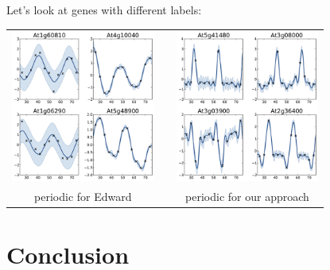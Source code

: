 \documentclass{beamer}
\begin{document}
\begin{frame}{}
Let's look at genes with different labels:
\begin{center}
 \begin{tabular}{ccc}
  \includegraphics[height=5cm]{figures/per_Ed_Only.pdf} & \qquad &\includegraphics[height=5cm]{figures/per_RKHS_Only.pdf} \\
  {\small periodic for Edward} & & {\small periodic for our approach}
 \end{tabular}
\end{center}
\end{frame}

\section{Conclusion}
\subsection{}
\end{document}
